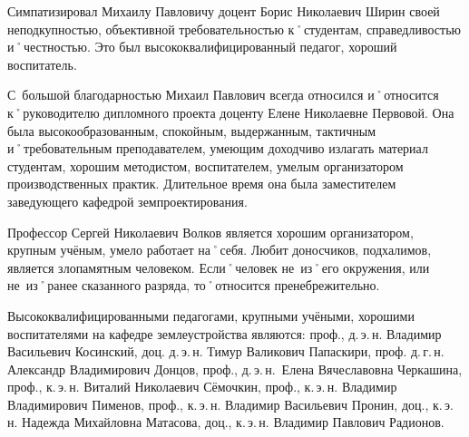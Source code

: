 Симпатизировал Михаилу Павловичу доцент Борис Николаевич Ширин своей неподкупностью, объективной требовательностью к˚студентам, справедливостью и˚честностью. Это был высококвалифицированный педагог, хороший воспитатель.

С~большой благодарностью Михаил Павлович всегда относился и˚относится к˚руководителю дипломного проекта доценту Елене Николаевне Первовой. Она была высокообразованным, спокойным, выдержанным, тактичным и˚требовательным преподавателем, умеющим доходчиво излагать материал студентам, хорошим методистом, воспитателем, умелым организатором производственных практик. Длительное время она была заместителем заведующего кафедрой земпроектирования.

Профессор Сергей Николаевич Волков является хорошим организатором, крупным учёным, умело работает на˚себя. Любит доносчиков, подхалимов, является злопамятным человеком. Если˚человек не~из˚его окружения, или не~из˚ранее сказанного разряда, то˚относится пренебрежительно. 

Высококвалифицированными педагогами, крупными учёными, хорошими воспитателями на кафедре землеустройства являются: проф., д.\,э.\,н. Владимир Васильевич Косинский, доц. д.\,э.\,н. Тимур Валикович Папаскири, проф. д.\,г.\,н. Александр Владимирович Донцов, проф., д.\,э.\,н.~Елена Вячеславовна Черкашина, проф., к.\,э.\,н. Виталий Николаевич Сёмочкин, проф., к.\,э.\,н. Владимир Владимирович Пименов, проф., к.\,э.\,н. Владимир Васильевич Пронин, доц., к.\,э.\,н. Надежда Михайловна Матасова, доц., к.\,э.\,н. Владимир Павлович Радионов.
